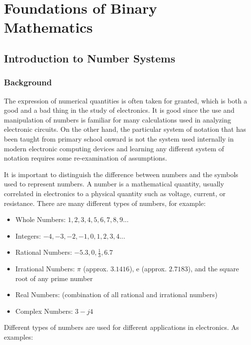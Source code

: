 \chapter{Foundations of Binary Mathematics}\label{ch02}
\section{Introduction to Number Systems}
\subsection{Background}

The expression of numerical quantities is often taken for granted, which is both a good and a bad thing in the study of electronics. It is good since the use and manipulation of numbers is familiar for many calculations used in analyzing electronic circuits. On the other hand, the particular system of notation that has been taught from primary school onward is not the system used internally in modern electronic computing devices and learning any different system of notation requires some re-examination of assumptions.

It is important to distinguish the difference between numbers and the symbols used to represent numbers. A number is a mathematical quantity, usually correlated in electronics to a physical quantity such as voltage, current, or resistance. There are many different types of numbers, for example:

\begin{itemize}
  \item Whole Numbers: $ 1, 2, 3, 4, 5, 6, 7, 8, 9 ... $
  \item Integers: $ -4, -3, -2, -1, 0, 1, 2, 3, 4 ...  $
  \item Rational Numbers: $ -5.3, 0, \frac{1}{3}, 6.7 $
  \item Irrational Numbers: $\pi $ (approx. $ 3.1416 $), e (approx. $ 2.7183 $), and the square root of any prime number 
  \item Real Numbers: (combination of all rational and irrational numbers) 
  \item Complex Numbers: $ 3 - j4 $
\end{itemize}

Different types of numbers are used for different applications in electronics. As examples:

